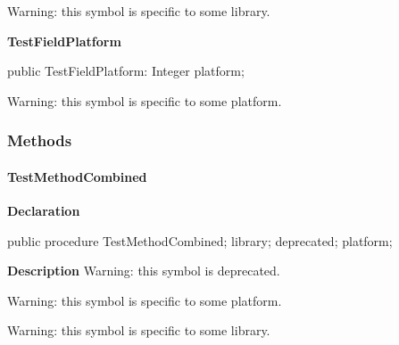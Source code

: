 \documentclass{report}
\newif\ifpdf
\begin{document}
\begin{list}{}
\begin{flushleft}
\ifpdf
\end{flushleft}
\fi


\par Warning: this symbol is specific to some library.

 \label{ok_hint_directives.TTestClassDeprecated-TestFieldPlatform}
\item[\textbf{TestFieldPlatform}\hfill]
\ifpdf
\begin{flushleft}
\fi
\begin{ttfamily}
public TestFieldPlatform: Integer platform;\end{ttfamily}

\ifpdf
\end{flushleft}
\fi


\par Warning: this symbol is specific to some platform.

 \end{list}
\subsubsection*{\large{\textbf{Methods}}\normalsize\hspace{1ex}\hfill}
\paragraph*{TestMethodCombined}\hspace*{\fill}

\label{ok_hint_directives.TTestClassDeprecated-TestMethodCombined}
\begin{list}{}{
\setlength{\itemindent}{0cm}
\setlength{\listparindent}{0cm}
\setlength{\leftmargin}{\evensidemargin}
\addtolength{\leftmargin}{\tmplength}
\settowidth{\labelsep}{X}
\addtolength{\leftmargin}{\labelsep}
\setlength{\labelwidth}{\tmplength}
}
\item[\textbf{Declaration}\hfill]
\ifpdf
\begin{flushleft}
\fi
\begin{ttfamily}
public procedure TestMethodCombined; library; deprecated; platform;\end{ttfamily}

\ifpdf
\end{flushleft}
\fi

\par
\item[\textbf{Description}]
Warning: this symbol is deprecated.

Warning: this symbol is specific to some platform.

Warning: this symbol is specific to some library.

 

\end{list}
\end{document}
